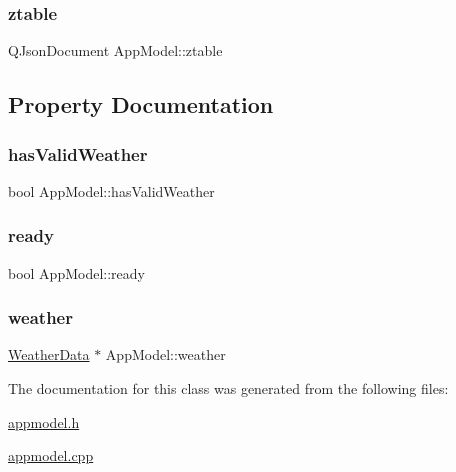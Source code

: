 \mbox{\label{class_app_model_a09d51e8d2cff7a4a34bd791d0674d338}} 
\subsubsection{\texorpdfstring{ztable}{ztable}}
{\footnotesize\ttfamily Q\+Json\+Document App\+Model\+::ztable}



\subsection{Property Documentation}
\mbox{\label{class_app_model_a493654987603c091935810e34e6b5c05}} 
\subsubsection{\texorpdfstring{has\+Valid\+Weather}{hasValidWeather}}
{\footnotesize\ttfamily bool App\+Model\+::has\+Valid\+Weather\hspace{0.3cm}{\ttfamily [read]}}

\mbox{\label{class_app_model_a2af4f584bf701bff4546e889c16316d7}} 
\subsubsection{\texorpdfstring{ready}{ready}}
{\footnotesize\ttfamily bool App\+Model\+::ready\hspace{0.3cm}{\ttfamily [read]}}

\mbox{\label{class_app_model_a72dfc16433c4ca50da689205e9db9298}} 
\subsubsection{\texorpdfstring{weather}{weather}}
{\footnotesize\ttfamily \hyperlink{class_weather_data}{Weather\+Data} $\ast$ App\+Model\+::weather\hspace{0.3cm}{\ttfamily [read]}}



The documentation for this class was generated from the following files\+:\begin{DoxyCompactItemize}
\item 
\hyperlink{appmodel_8h}{appmodel.\+h}\item 
\hyperlink{appmodel_8cpp}{appmodel.\+cpp}\end{DoxyCompactItemize}
